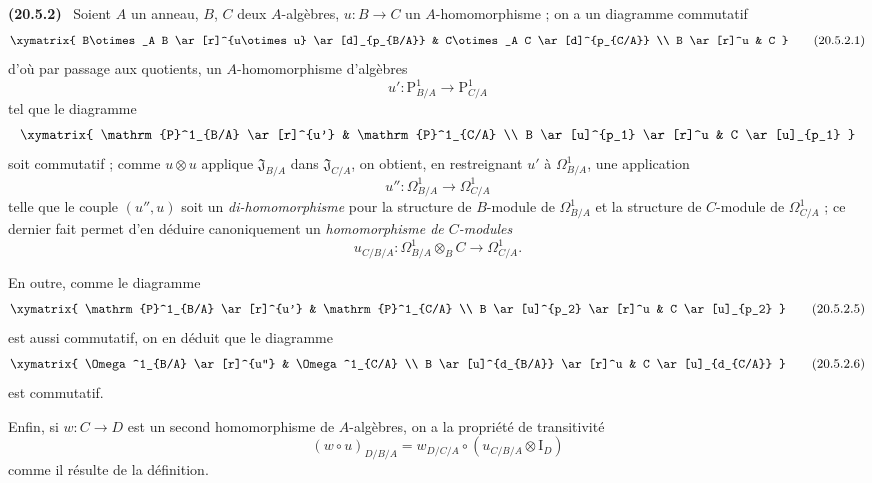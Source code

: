 \documentclass[10pt,oneside]{book}
\makeatletter
\newcommand{\setmanualcurrentlabel}[1]{\def\@currentlabel{#1}}
\newcommand{\oldpage}[2][]{%
  \setcounter{footnote}{0}%
  \marginpar{\scriptsize\textbf{#1}~|~#2}\ignorespaces}
\newenvironment{env}[1][]{\setmanualcurrentlabel{#1}\par\medskip\noindent\textbf{(#1)}\ }{\par}
\makeatother
\begin{document}
\begin{env}[20.5.2]
\label{0.20.5.2-fr}
Soient $A$ un anneau, $B$, $C$ deux $A$-algèbres, $u:B\to C$ un
$A$-homomorphisme ; on a un diagramme commutatif
\[
\xymatrix{
  B\otimes_A B \ar[r]^{u\otimes u} \ar[d]_{p_{B/A}} &
  C\otimes_A C \ar[d]^{p_{C/A}} \\
  B \ar[r]^u & C
}
\tag{20.5.2.1}
\label{0.20.5.2.1-fr}
\]
d'où par passage aux quotients, un $A$-homomorphisme d'algèbres
\begin{equation}
\tag{20.5.2.2}
\label{0.20.5.2.2-fr}
  u':\mathrm{P}^1_{B/A}\to\mathrm{P}^1_{C/A}
\end{equation}
tel que le diagramme
\[
\xymatrix{
  \mathrm{P}^1_{B/A} \ar[r]^{u'} & \mathrm{P}^1_{C/A} \\
  B \ar[u]^{p_1} \ar[r]^u & C \ar[u]_{p_1}
}
\]
soit commutatif ; comme $u\otimes u$ applique $\mathfrak{J}_{B/A}$ dans
$\mathfrak{J}_{C/A}$, on obtient, en restreignant $u'$ à
$\Omega^1_{B/A}$, une application
\begin{equation}
\tag{20.5.2.3}
\label{0.20.5.2.3-fr}
  u'':\Omega^1_{B/A}\to\Omega^1_{C/A}
\end{equation}
telle que le couple $(u'',u)$ soit un \emph{di-homomorphisme} pour la
structure de $B$-module de $\Omega^1_{B/A}$ et la structure de $C$-module de
$\Omega^1_{C/A}$ ; ce dernier fait permet d'en déduire canoniquement un
\emph{homomorphisme de $C$-modules}
\begin{equation}
\tag{20.5.2.4}
\label{0.20.5.2.4-fr}
  u_{C/B/A}:\Omega^1_{B/A}\otimes_B C\to\Omega^1_{C/A}.
\end{equation}

\oldpage[0\textsubscript{IV-1}]{129}
En outre, comme le diagramme
\[
\xymatrix{
  \mathrm{P}^1_{B/A} \ar[r]^{u'} & \mathrm{P}^1_{C/A} \\
  B \ar[u]^{p_2} \ar[r]^u & C \ar[u]_{p_2}
}
\tag{20.5.2.5}
\label{0.20.5.2.5-fr}
\]
est aussi commutatif, on en déduit que le diagramme
\[
\xymatrix{
  \Omega^1_{B/A} \ar[r]^{u''} & \Omega^1_{C/A} \\
  B \ar[u]^{d_{B/A}} \ar[r]^u & C \ar[u]_{d_{C/A}}
}
\tag{20.5.2.6}
\label{0.20.5.2.6-fr}
\]
est commutatif.

Enfin, si $w:C\to D$ est un second homomorphisme de $A$-algèbres, on a la
propriété de transitivité
\begin{equation}
\tag{20.5.2.7}
\label{0.20.5.2.7-fr}
  (w\circ u)_{D/B/A}
  =w_{D/C/A}\circ(u_{C/B/A}\otimes\mathrm{I}_D)
\end{equation}
comme il résulte de la définition.
\end{env}
\end{document}
